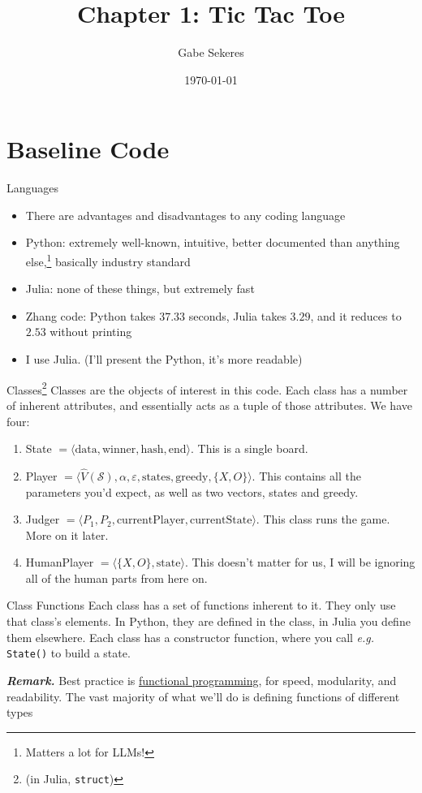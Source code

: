 \documentclass{beamer}
\title{Chapter 1: Tic Tac Toe}
\date{\today}
\author{Gabe Sekeres}
\institute{Cornell University}
\begin{document}
  \maketitle
  \section{Baseline Code}
  \begin{frame}{Languages}
  	\begin{itemize}[<+->]
  		\item There are advantages and disadvantages to any coding language
  		\item Python: extremely well-known, intuitive, better documented than anything else,\footnote{Matters a lot for LLMs!} basically industry standard
  		\item Julia: none of these things, but extremely fast
  		\item Zhang code: Python takes $37.33$ seconds, Julia takes $3.29$, and it reduces to $2.53$ without printing
  		\item I use Julia. (I'll present the Python, it's more readable)
  	\end{itemize}
  \end{frame}
  \begin{frame}{Classes\footnote{(in Julia, \texttt{struct})}}
    	Classes are the objects of interest in this code. Each class has a number of inherent attributes, and essentially acts as a tuple of those attributes. We have four:
    	\begin{enumerate}
    		\item State $= \langle \text{data}, \text{winner}, \text{hash}, \text{end}\rangle$. This is a single board.
    		\item Player $= \langle \hat{V}(\mathcal{S}),\alpha,\varepsilon,\text{states},\text{greedy},\{X,O\}\rangle$. This contains all the parameters you'd expect, as well as two vectors, states and greedy.
    		\item Judger $= \langle P_1,P_2,\text{currentPlayer},\text{currentState}\rangle$. This class runs the game. More on it later.
    		\item HumanPlayer $= \langle \{X,O\},\text{state}\rangle$. This doesn't matter for us, I will be ignoring all of the human parts from here on.
    	\end{enumerate}
  \end{frame}
  \begin{frame}{Class Functions}
  		Each class has a set of functions inherent to it. They only use that class's elements. In Python, they are defined in the class, in Julia you define them elsewhere. Each class has a constructor function, where you call \textit{e.g.} \texttt{State()} to build a state.
  		
  		\textbf{\textit{Remark.}} Best practice is \textcolor{blue}{\href{https://en.wikipedia.org/wiki/Functional_programming}{functional programming}}, for speed, modularity, and readability. The vast majority of what we'll do is defining functions of different types
  \end{frame}
\end{document}
